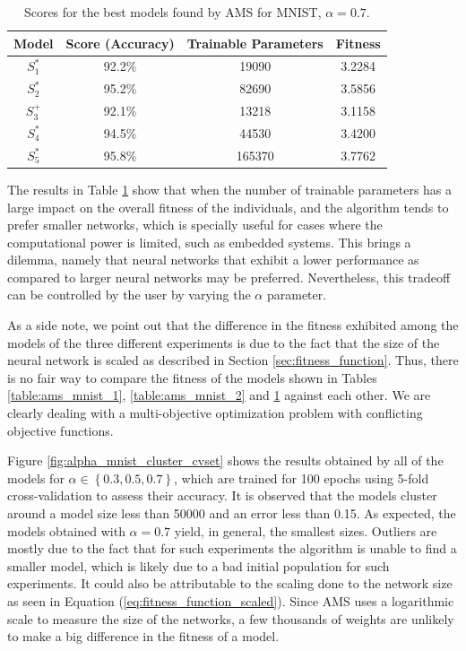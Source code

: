 \documentclass[12pt]{elsart}%
\begin{document}
\begin{table}[!htb]
\begin{center}
\begin{tabular}{| c | c | c | c |}
\hline
Model & Score (Accuracy) & Trainable Parameters & Fitness\\
\hline
$S^*_1$ & 92.2\% & 19090 & 3.2284\\
$S^*_2$ & 95.2\% & 82690 & 3.5856\\
$S^+_3$ & 92.1\% & 13218 & 3.1158\\
$S^*_4$ & 94.5\% & 44530 & 3.4200\\
$S^*_5$ & 95.8\% & 165370 & 3.7762\\
\hline
\end{tabular}
\end{center}
\caption{Scores for the best models found by AMS for MNIST, $\alpha = 0.7$.}
\label{table:ams_mnist_3}
\end{table}

The results in Table \ref{table:ams_mnist_3} show that when the number of trainable parameters has a large impact on the overall fitness of the individuals, and the algorithm tends to prefer smaller networks, which is specially useful for cases where the computational power is limited, such as embedded systems. This brings a dilemma, namely that neural networks that exhibit a lower performance as compared to larger neural networks may be preferred. Nevertheless, this tradeoff can be controlled by the user by varying the $\alpha$ parameter. 

As a side note, we point out that the difference in the fitness exhibited among the models of the three different experiments is due to the fact that the size of the neural network is scaled as described in Section \ref{sec:fitness_function}. Thus, there is no fair way to compare the fitness of the models shown in Tables \ref{table:ams_mnist_1}, \ref{table:ams_mnist_2} and \ref{table:ams_mnist_3} against each other. We are clearly dealing with a multi-objective optimization problem with conflicting objective functions.

Figure \ref{fig:alpha_mnist_cluster_cvset} shows the results obtained by all of the models for $\alpha \in \left\lbrace 0.3, 0.5, 0.7  \right\rbrace$, which are trained for 100 epochs using 5-fold cross-validation to assess their accuracy. It is observed that the models cluster around a model size less than 50000 and an error less than 0.15. As expected, the models obtained with $\alpha = 0.7$ yield, in general, the smallest sizes. Outliers are mostly due to the fact that for such experiments the algorithm is unable to find a smaller model, which is likely due to a bad initial population for such experiments. It could also be attributable to the scaling done to the network size as seen in Equation  (\ref{eq:fitness_function_scaled}). Since AMS uses a logarithmic scale to measure the size of the networks, a few thousands of weights are unlikely to make a big difference in the fitness of a model. 
\end{document}
